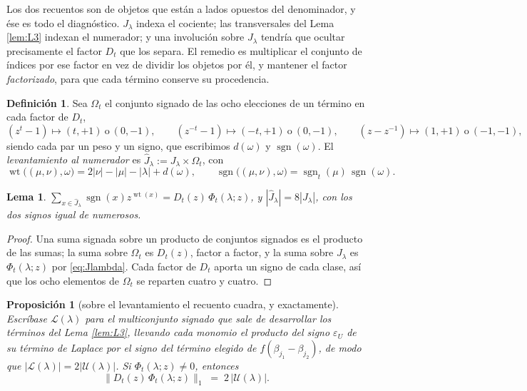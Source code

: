 \documentclass[11pt,reqno]{amsart}
\theoremstyle{plain}
\newtheorem{lemma}[theorem]{Lema}
\newtheorem{proposition}[theorem]{Proposición}
\theoremstyle{definition}
\newtheorem{definition}[theorem]{Definición}
\newcommand{\sgn}{\operatorname{sgn}}
\newcommand{\wt}{\operatorname{wt}}
\begin{document}
Los dos recuentos son de objetos que están a lados opuestos del denominador, y ése es todo el
diagnóstico. $J_\lambda$ indexa el cociente; las transversales del Lema \ref{lem:L3} indexan el
numerador; y una involución sobre $J_\lambda$ tendría que ocultar precisamente el factor $D_t$ que
los separa. El remedio es multiplicar el conjunto de índices por ese factor en vez de dividir los
objetos por él, y mantener el factor \emph{factorizado}, para que cada término conserve su
procedencia.

\begin{definition}\label{def:lift}
Sea $\Omega_t$ el conjunto signado de las ocho elecciones de un término en cada factor de $D_t$,
\[
(z^t-1)\mapsto(t,+1)\ \text{o}\ (0,-1),\qquad
(z^{-t}-1)\mapsto(-t,+1)\ \text{o}\ (0,-1),\qquad
(z-z^{-1})\mapsto(1,+1)\ \text{o}\ (-1,-1),
\]
siendo cada par un peso y un signo, que escribimos $d(\omega)$ y $\sgn(\omega)$. El
\emph{levantamiento al numerador} es $\widehat J_\lambda:=J_\lambda\times\Omega_t$, con
\[
\wt\bigl((\mu,\nu),\omega\bigr)=2|\nu|-|\mu|-|\lambda|+d(\omega),
\qquad
\sgn\bigl((\mu,\nu),\omega\bigr)=\sgn_t(\mu)\,\sgn(\omega).
\]
\end{definition}

\begin{lemma}\label{lem:liftid}
$\sum_{x\in\widehat J_\lambda}\sgn(x)z^{\wt(x)}=D_t(z)\,\Phi_t(\lambda;z)$, y
$|\widehat J_\lambda|=8|J_\lambda|$, con los dos signos igual de numerosos.
\end{lemma}

\begin{proof}
Una suma signada sobre un producto de conjuntos signados es el producto de las sumas; la suma sobre
$\Omega_t$ es $D_t(z)$, factor a factor, y la suma sobre $J_\lambda$ es $\Phi_t(\lambda;z)$ por
\eqref{eq:Jlambda}. Cada factor de $D_t$ aporta un signo de cada clase, así que los ocho elementos de
$\Omega_t$ se reparten cuatro y cuatro.
\end{proof}

\begin{proposition}[sobre el levantamiento el recuento cuadra, y exactamente]\label{prop:liftcount}
Escríbase $\mathcal L(\lambda)$ para el multiconjunto \emph{signado} que sale de desarrollar los
términos del Lema \ref{lem:L3}, llevando cada monomio el producto del signo $\varepsilon_U$ de su
término de Laplace por el signo del término elegido de $f(\beta_{j_1}-\beta_{j_2})$, de modo que
$|\mathcal L(\lambda)|=2|\mathcal U(\lambda)|$. Si $\Phi_t(\lambda;z)\ne0$, entonces
\[
\bigl\|D_t(z)\,\Phi_t(\lambda;z)\bigr\|_1\;=\;2\,|\mathcal U(\lambda)| .
\]
\end{proposition}
\end{document}

